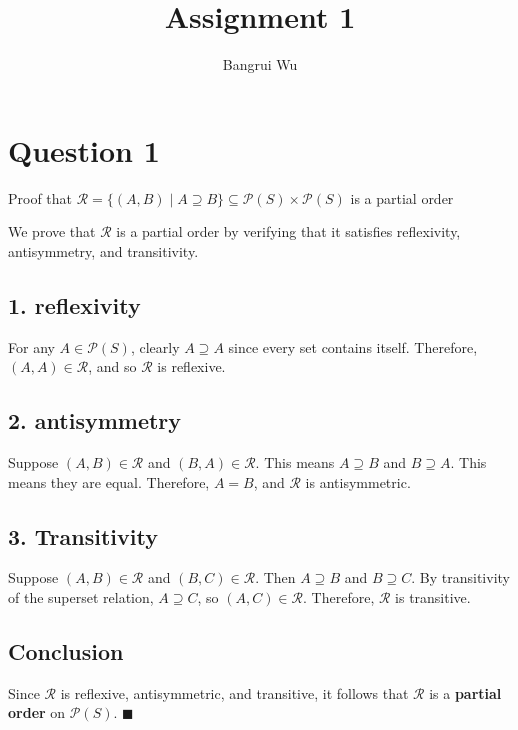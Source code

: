 \documentclass[a4paper,12pt]{article}
\title{Assignment 1}
\author{Bangrui Wu}
\begin{document}
\maketitle

\section*{Question 1}

{Proof that \( \mathcal{R} = \{(A, B)\mid A \supseteq B\} \subseteq \mathcal{P}(S) \times \mathcal{P}(S) \) is a partial order}

We prove that \( \mathcal{R} \) is a partial order by verifying that it satisfies reflexivity, antisymmetry, and transitivity.

\subsection*{1. reflexivity}

For any \( A \in \mathcal{P}(S) \), clearly \( A \supseteq A \) since every set contains itself.
Therefore, \( (A, A) \in \mathcal{R} \), and so \( \mathcal{R} \) is reflexive.

\subsection*{2. antisymmetry}
Suppose \( (A, B) \in \mathcal{R} \) and \( (B, A) \in \mathcal{R} \).
This means \( A \supseteq B \) and \( B \supseteq A\).
This means they are equal.
Therefore, \( A = B \), and \( \mathcal{R} \) is antisymmetric.

\subsection*{3. Transitivity}

Suppose \( (A, B) \in \mathcal{R} \) and \( (B, C) \in \mathcal{R} \).  
Then \( A \supseteq B \) and \( B \supseteq C \).  
By transitivity of the superset relation, \( A \supseteq C \), so \( (A, C) \in \mathcal{R} \).  
Therefore, \( \mathcal{R} \) is transitive.

\subsection*{Conclusion}

Since \( \mathcal{R} \) is reflexive, antisymmetric, and transitive, it follows that \( \mathcal{R} \) is a \textbf{partial order} on \( \mathcal{P}(S) \). \hfill \( \blacksquare \)
\end{document}
